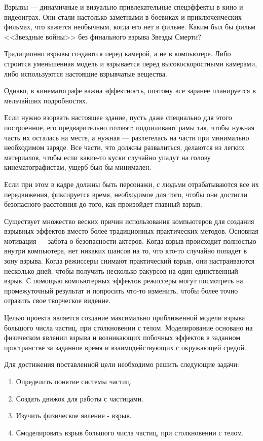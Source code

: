 \Introduction

\hfill

	Взрывы --- динамичные и визуально привлекательные спецэффекты в кино и видеоиграх. Они стали настолько заметными в боевиках и приключенческих фильмах, что кажется необычным, когда его нет в фильме. Каким был бы фильм <<Звездные войны>> без финального взрыва Звезды Смерти? 
	
	Традиционно взрывы создаются перед камерой, а не в компьютере. Либо строится уменьшенная модель и взрывается перед высокоскоростными камерами, либо используются настоящие взрывчатые вещества. 
	
	Однако, в кинематографе важна эффектность, поэтому все заранее планируется в мельчайших подробностях.
	
	Если нужно взорвать настоящее здание, пусть даже специально для этого построенное, его предварительно готовят: подпиливают рамы так, чтобы нужная часть их осталась на месте, а нужная --- разлетелась на части при минимально необходимом заряде. Все части, что должны развалиться, делаются из легких материалов, чтобы если какие-то куски случайно упадут на голову кинематографистам, ущерб был бы минимален. 
	
	Если при этом в кадре должны быть персонажи, с людьми отрабатываются все их передвижения, фиксируется время, необходимое для того, чтобы они достигли безопасного расстояния до того, как произойдет главный взрыв. \cite{cinemaexplosion}
	
	Существует множество веских причин использования компьютеров для создания взрывных эффектов вместо более традиционных практических методов. Основная мотивация --- забота о безопасности актеров. Когда взрыв происходит полностью внутри компьютера, нет никаких шансов на то, что кто-то случайно попадет в зону взрыва. Когда режиссеры снимают практический взрыв, они настраиваются несколько дней, чтобы получить несколько ракурсов на один единственный взрыв. С помощью компьютерных эффектов режиссеры могут посмотреть на промежуточный результат и попросить что-то изменить, чтобы более точно отразить свое творческое видение. 
	
	Целью проекта является создание максимально приближенной модели взрыва большого числа частиц, при столкновении с телом. Моделирование основано на физическом явлении взрыва и возникающих побочных эффектов в заданном пространстве за заданное время и взаимодействующих с окружающей средой. 
	
	Для достижения поставленной цели необходимо решить следующие задачи:
	\begin{enumerate}
		\item Определить понятие системы частиц. 
		\item Создать движок для работы с частицами. 
		\item Изучить физическое явление - взрыв. 
		\item Смоделировать взрыв большого числа частиц, при столкновении с телом. 
	\end{enumerate}



